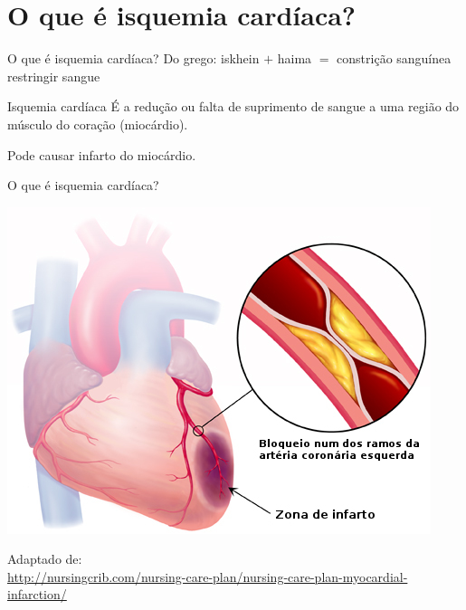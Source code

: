 
\section{O que é isquemia cardíaca?}

\begin{frame}{O que é isquemia cardíaca?}
    Do grego:
    \hskip10pt \alert{iskhein} $+$ \alert{haima} $=$ constrição sanguínea\\
    \hskip55pt restringir\hskip10pt sangue
    \vskip20pt
    \begin{block}{\alert{Isquemia cardíaca}}
        É a redução ou falta de suprimento de sangue a uma região do músculo do coração (miocárdio).
    \end{block}
    \vskip20pt
    Pode causar infarto do miocárdio.
\end{frame}

\begin{frame}{O que é isquemia cardíaca?}
    \begin{center}
        \includegraphics[scale=0.5]{figures/infarction.jpg}
    \end{center}
    \tiny Adaptado de:\\
    \url{http://nursingcrib.com/nursing-care-plan/nursing-care-plan-myocardial-infarction/}
\end{frame}